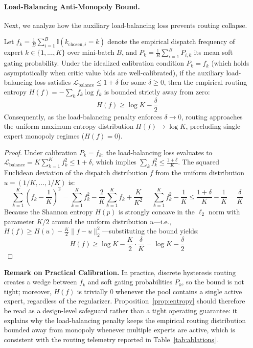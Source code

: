 \paragraph{Load-Balancing Anti-Monopoly Bound.}
Next, we analyze how the auxiliary load-balancing loss prevents routing collapse.
\begin{prop}
\label{prop:entropy}
Let $f_k = \frac{1}{B}\sum_{i=1}^B \mathbb{I}(k_{\text{chosen},i}=k)$ denote the empirical dispatch frequency of expert $k \in \{1,\dots,K\}$ over mini-batch $B$, and $P_k = \frac{1}{B}\sum_{i=1}^B P_{i,k}$ its mean soft gating probability. Under the idealized calibration condition $P_k = f_k$ (which holds asymptotically when critic value bids are well-calibrated), if the auxiliary load-balancing loss satisfies $\mathcal{L}_{\text{balance}} \le 1 + \delta$ for some $\delta \ge 0$, then the empirical routing entropy $H(f) = -\sum_k f_k \log f_k$ is bounded strictly away from zero:
\begin{equation}
\label{eq:entropy_bound}
H(f) \ge \log K - \frac{\delta}{2}
\end{equation}
Consequently, as the load-balancing penalty enforces $\delta \to 0$, routing approaches the uniform maximum-entropy distribution $H(f) \to \log K$, precluding single-expert monopoly regimes ($H(f) = 0$).
\end{prop}
\begin{proof}
Under calibration $P_k = f_k$, the load-balancing loss evaluates to $\mathcal{L}_{\text{balance}} = K \sum_{k=1}^K f_k^2 \le 1 + \delta$, which implies $\sum_k f_k^2 \le \frac{1+\delta}{K}$. The squared Euclidean deviation of the dispatch distribution $f$ from the uniform distribution $u = (1/K, \dots, 1/K)$ is:
\begin{equation}
\sum_{k=1}^K \left(f_k - \frac{1}{K}\right)^2 = \sum_{k=1}^K f_k^2 - \frac{2}{K}\sum_{k=1}^K f_k + \frac{K}{K^2} = \sum_{k=1}^K f_k^2 - \frac{1}{K} \le \frac{1+\delta}{K} - \frac{1}{K} = \frac{\delta}{K}
\end{equation}
Because the Shannon entropy $H(p)$ is strongly concave in the $\ell_2$ norm with parameter $K/2$ around the uniform distribution $u$---i.e., $H(f) \ge H(u) - \frac{K}{2} \|f - u\|_2^2$---substituting the bound yields:
\begin{equation}
H(f) \ge \log K - \frac{K}{2} \cdot \frac{\delta}{K} = \log K - \frac{\delta}{2}
\end{equation}
\end{proof}
\noindent \textbf{Remark on Practical Calibration.} In practice, discrete hysteresis routing creates a wedge between $f_k$ and soft gating probabilities $P_k$, so the bound is not tight; moreover, $H(f)$ is trivially $0$ whenever the pool contains a single active expert, regardless of the regularizer. Proposition~\ref{prop:entropy} should therefore be read as a design-level safeguard rather than a tight operating guarantee: it explains why the load-balancing penalty keeps the empirical routing distribution bounded away from monopoly whenever multiple experts are active, which is consistent with the routing telemetry reported in Table~\ref{tab:ablations}.
